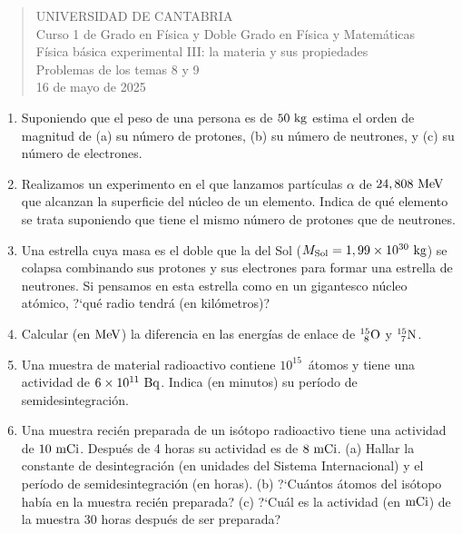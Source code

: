 \documentclass[11pt]{articulo}
\begin{document}
\begin{verse}
{\Large UNIVERSIDAD DE CANTABRIA}\\ 
\vspace*{0.5cm}
{\normalsize \rm Curso 1 de Grado en F\'isica y Doble Grado en F\'isica y Matem\'aticas}\\
{\normalsize \rm F\'isica b\'asica experimental III: la materia y sus propiedades}\\ 
{\normalsize \rm Problemas de los temas 8 y 9}\\
{\normalsize \rm 16 de mayo de 2025}\\
\end{verse} 

\vspace*{0.25cm}

\begin{enumerate}

\item Suponiendo que el peso de una persona es de $50~{\rm kg}$ estima el orden de magnitud de (a) su n\'umero de protones, (b) su n\'umero de neutrones, y (c) su n\'umero de electrones.

\item Realizamos un experimento en el que lanzamos part\'iculas $\alpha$ de $24,808~{\rm MeV}$ que alcanzan la superficie del n\'ucleo de un elemento. Indica de qu\'e elemento se trata suponiendo que tiene el mismo n\'umero de protones que de neutrones.

\item Una estrella cuya masa es el doble que la del Sol ($M_{\rm Sol} = 1,99 \times 10^{30}~{\rm kg}$) se colapsa combinando sus protones y sus electrones para formar una estrella de neutrones. Si pensamos en esta estrella como en un gigantesco n\'ucleo at\'omico, ?`qu\'e radio tendr\'a (en kil\'ometros)?

\item Calcular (en ${\rm MeV}$) la diferencia en las energ\'ias de enlace de $_{~8}^{15}{\rm O}$ y $_{~7}^{15}{\rm N}$.

\item Una muestra de material radioactivo contiene $10^{15}$~\'atomos y tiene una actividad de $6\times 10^{11}~{\rm Bq}$. Indica (en minutos) su per\'iodo de semidesintegraci\'on.

\item Una muestra reci\'en preparada de un is\'otopo radioactivo tiene una actividad de $10~{\rm mCi}$. Despu\'es de 4 horas su actividad es de $8~{\rm mCi}$. (a) Hallar la constante de desintegraci\'on (en unidades del Sistema Internacional) y el per\'iodo de semidesintegraci\'on (en horas). (b) ?`Cu\'antos \'atomos del is\'otopo hab\'ia en la muestra reci\'en preparada? (c) ?`Cu\'al es la actividad (en ${\rm mCi}$) de la muestra 30 horas despu\'es de ser preparada?


\end{enumerate}
\end{document}

